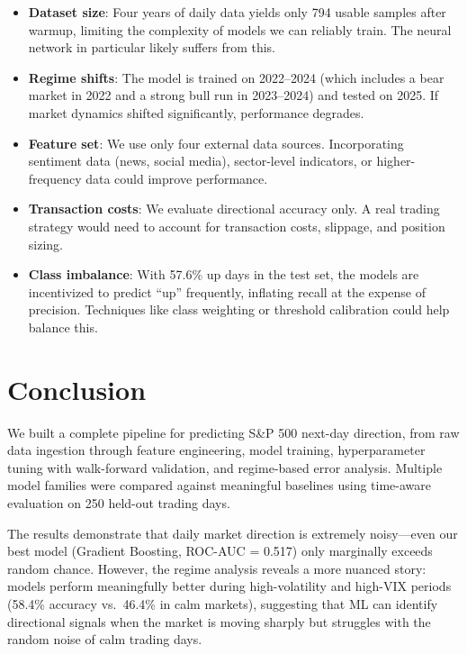\documentclass[11pt]{article}
\begin{document}
\begin{itemize}
    \item \textbf{Dataset size}: Four years of daily data yields only 794 usable samples after warmup, limiting the complexity of models we can reliably train. The neural network in particular likely suffers from this.

    \item \textbf{Regime shifts}: The model is trained on 2022--2024 (which includes a bear market in 2022 and a strong bull run in 2023--2024) and tested on 2025. If market dynamics shifted significantly, performance degrades.

    \item \textbf{Feature set}: We use only four external data sources. Incorporating sentiment data (news, social media), sector-level indicators, or higher-frequency data could improve performance.

    \item \textbf{Transaction costs}: We evaluate directional accuracy only. A real trading strategy would need to account for transaction costs, slippage, and position sizing.

    \item \textbf{Class imbalance}: With 57.6\% up days in the test set, the models are incentivized to predict ``up'' frequently, inflating recall at the expense of precision. Techniques like class weighting or threshold calibration could help balance this.
\end{itemize}

\section{Conclusion}
\label{sec:conclusion}

We built a complete pipeline for predicting S\&P 500 next-day direction, from raw data ingestion through feature engineering, model training, hyperparameter tuning with walk-forward validation, and regime-based error analysis. Multiple model families were compared against meaningful baselines using time-aware evaluation on 250 held-out trading days.

The results demonstrate that daily market direction is extremely noisy---even our best model (Gradient Boosting, ROC-AUC = 0.517) only marginally exceeds random chance. However, the regime analysis reveals a more nuanced story: models perform meaningfully better during high-volatility and high-VIX periods (58.4\% accuracy vs.\ 46.4\% in calm markets), suggesting that ML can identify directional signals when the market is moving sharply but struggles with the random noise of calm trading days.
\end{document}
